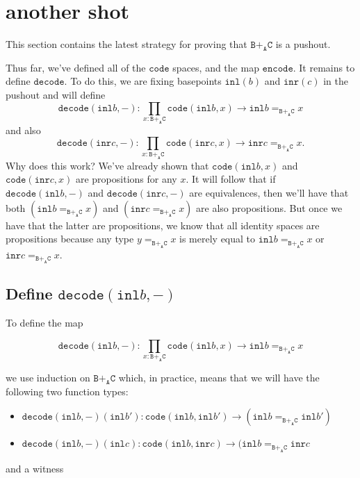 \documentclass[12pt]{amsart}
\newcommand{\from}{\colon}
\newcommand{\type}[1]{\mathtt{#1}}
\newcommand{\tin}{\colon}
\newcommand{\A}{\type{A}}
\newcommand{\B}{\type{B}}
\newcommand{\C}{\type{C}}
\newcommand{\BAC}{\B +_{\A} \C}
\newcommand{\inl}{\type{inl}}
\newcommand{\inr}{\type{inr}}
\newcommand{\code}{\type{code}}
\newcommand{\encode}{\type{encode}}
\newcommand{\decode}{\type{decode}}
\theoremstyle{remark}
\theoremstyle{definition}
\begin{document}
\pagebreak


\section{another shot}

This section contains the latest strategy for proving that \( \BAC \)
is a pushout.

Thus far, we've defined all of the \( \code \) spaces, and the map \(
\encode \).  It remains to define \( \decode \). To do this, we are
fixing basepoints \( \inl (b) \) and \( \inr (c) \) in the pushout
and will define
\[
  \decode ( \inl b , - ) \from
  \prod\limits_{x \tin \BAC} \code ( \inl b , x ) \to
  \inl b =_{\BAC} x
\]
and also 
\[
  \decode ( \inr c , - ) \from
  \prod\limits_{x \tin \BAC} \code ( \inr c , x ) \to
  \inr c =_{\BAC} x.
\]
Why does this work?  We've already shown that \( \code ( \inl b , x ) \)
and \( \code ( \inr c , x ) \) are propositions for any \( x \).  It
will follow that if \( \decode (\inl b , - ) \) and
\( \decode ( \inr c , - ) \) are equivalences, then we'll have that
both \( (\inl b =_{\BAC} x ) \) and \( ( \inr c =_{\BAC} x ) \) are
also propositions. But once we have that the latter are propositions,
we know that all identity spaces are propositions because any type
\( y =_{\BAC} x \) is merely equal to \( \inl b =_{\BAC} x \) or
\( \inr c =_{\BAC} x \).

\subsection{Define $ \decode ( \inl b , - ) $} %

To define the map

\begin{equation} \label{eq:decode-b-blank}
  \decode ( \inl b , - )
  \from
  \prod\limits_{x \tin \BAC} \code ( \inl b , x )
  \to
  \inl b =_{\BAC} x
\end{equation}

we use induction on \( \BAC \) which, in practice, means that we will
have the following two function types:
%
\begin{itemize}
\item
  \( \decode ( \inl b , - ) ( \inl b' )
  \from
  \code (\inl b , \inl b')
  \to
  ( \inl b =_{\BAC} \inl b' ) \)
\item
  \( \decode ( \inl b , - ) ( \inl c )
  \from
  \code ( \inl b , \inr c )
  \to
  ( \inl b =_{\BAC} \inr c \) 
\end{itemize}
%
and a witness
\end{document}
